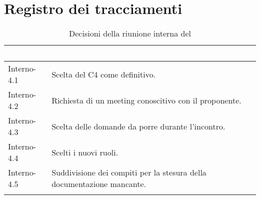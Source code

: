 \section{Registro dei tracciamenti}
{
\renewcommand{\arraystretch}{1.5}
\centering
\begin{longtable}{C{3cm} C{9cm}}
\textcolor{white}{\textbf{Codice}}&
\textcolor{white}{\textbf{Decisione}}\\	
\endhead
		
Interno-4.1 & Scelta del  C4 come definitivo.\\

Interno-4.2 & Richiesta di un meeting conoscitivo con il proponente.\\

Interno-4.3 & Scelta delle domande da porre durante l'incontro.\\

Interno-4.4 & Scelti i nuovi ruoli.\\

Interno-4.5 & Suddivisione dei compiti per la stesura della documentazione mancante.\\
		
\caption{Decisioni della riunione interna del \Data{}}
\end{longtable}
}
